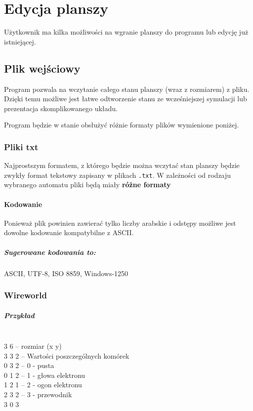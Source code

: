 \documentclass{report}
\begin{document}
\chapter{Edycja planszy}
Użytkownik ma kilka możliwości na wgranie planszy do programu lub edycję już istniejącej.

\section{Plik wejściowy}  \label{format}
Program pozwala na wczytanie całego stanu planszy (wraz z rozmiarem) z pliku. Dzięki temu możliwe jest łatwe odtworzenie stanu ze wcześniejszej symulacji lub prezentacja skomplikowanego układu.

Program będzie w stanie obsłużyć różnie formaty plików wymienione poniżej.

\subsection{Pliki txt}
Najprostszym formatem, z którego będzie można wczytać stan planszy będzie zwykły format tekstowy zapisany w plikach \texttt{.txt}. W zależności od rodzaju wybranego automatu pliki będą miały \textbf{różne formaty}

\subsubsection{Kodowanie}
Ponieważ plik powinien zawierać tylko liczby arabskie i odstępy możliwe jest dowolne kodowanie kompatybilne z ASCII. \\
\paragraph{Sugerowane kodowania to:}
ASCII, UTF-8, ISO 8859, Windows-1250

\subsection{Wireworld}

\begin{samepage}
\paragraph{Przykład}\mbox{}\\
3 6 \tab -- rozmiar (x y) \\
3 3 2 \tab -- Wartości poszczególnych komórek \\
0 3 2 \tab -- 0 - pusta \\
0 1 2 \tab -- 1 - głowa elektronu \\
1 2 1 \tab -- 2 - ogon elektronu \\
2 3 2 \tab -- 3 - przewodnik \\
3 0 3 \\
\end{samepage}
\end{document}
